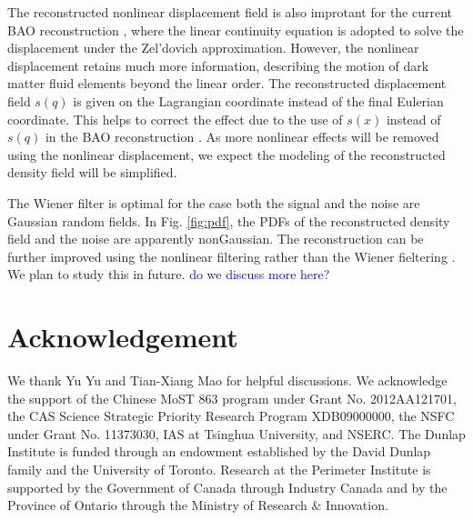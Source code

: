 \documentclass[aps,prd,twocolumn,showpacs,superscriptaddress,groupedaddress,nofootinbib]{revtex4}  %
\newcommand{\tcb}{\textcolor{blue}}
\begin{document}
The reconstructed nonlinear displacement field is also improtant for the 
current BAO reconstruction \cite{2007bao}, where the linear continuity
equation is adopted to solve the displacement under the Zel'dovich 
approximation. 
However, the nonlinear displacement retains much more information, describing 
the motion of dark matter fluid elements beyond the linear order.
The reconstructed displacement field $s(q)$ is given on the Lagrangian 
coordinate instead of the final Eulerian coordinate. 
This helps to correct the effect due to the use of $s(x)$ instead of $s(q)$ 
in the BAO reconstruction \cite{2015MNRAS.450.3822W,2015PhRvD..92l3522S}.
As more nonlinear effects will be removed using the nonlinear displacement,
we expect the modeling of the reconstructed density field will be simplified.

The Wiener filter is optimal for the case both the signal and the noise are
Gaussian random fields. In Fig. \ref{fig:pdf}, the PDFs of the reconstructed
density field and the noise are apparently nonGaussian.
The reconstruction can be further improved using the nonlinear filtering
rather than the Wiener fieltering \cite{1999RSPTA.357.2561P}.
We plan to study this in future.
\tcb{do we discuss more here?}

\section{Acknowledgement}
We thank Yu Yu and Tian-Xiang Mao for helpful discussions.
We acknowledge the support of the Chinese MoST 863 program under Grant 
No. 2012AA121701, the CAS Science Strategic Priority Research Program 
XDB09000000, the NSFC under Grant No. 11373030, IAS at Tsinghua University, 
 and NSERC.
The Dunlap Institute is funded through an endowment established by the David Dunlap family and the University of Toronto.
Research at the Perimeter Institute is supported by the Government of Canada
through Industry Canada and by the Province of Ontario through the Ministry of
Research $\&$ Innovation.



\end{document}
